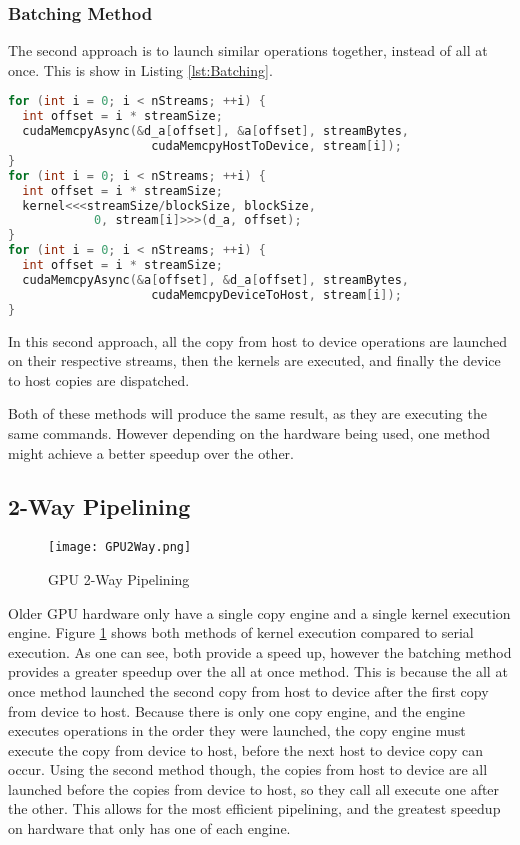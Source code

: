 \subsubsection{Batching Method}
The second approach is to launch similar operations together, instead of all at once. This is show in Listing \ref{lst:Batching}.
\begin{lstlisting}[language=C++,caption={Operations batched},label={lst:Batching}]
for (int i = 0; i < nStreams; ++i) {
  int offset = i * streamSize;
  cudaMemcpyAsync(&d_a[offset], &a[offset], streamBytes, 
                    cudaMemcpyHostToDevice, stream[i]);
}
for (int i = 0; i < nStreams; ++i) {
  int offset = i * streamSize;
  kernel<<<streamSize/blockSize, blockSize, 
            0, stream[i]>>>(d_a, offset);
}
for (int i = 0; i < nStreams; ++i) {
  int offset = i * streamSize;
  cudaMemcpyAsync(&a[offset], &d_a[offset], streamBytes, 
                    cudaMemcpyDeviceToHost, stream[i]);
}
\end{lstlisting}
In this second approach, all the copy from host to device operations are launched on their respective streams, then the kernels are executed, and finally the device to host copies are dispatched.

Both of these methods will produce the same result, as they are executing the same commands. However depending on the hardware being used, one method might achieve a better speedup over the other.

\subsection{2-Way Pipelining}
\begin{figure}[htp]
\centering
\texttt{[image: GPU2Way.png]}
\caption{GPU 2-Way Pipelining}
\label{fig:GPU2Way}
\end{figure}
Older GPU hardware only have a single copy engine and a single kernel execution engine. Figure \ref{fig:GPU2Way} shows both methods of kernel execution compared to serial execution. As one can see, both provide a speed up, however the batching method provides a greater speedup over the all at once method. This is because the all at once method launched the second copy from host to device after the first copy from device to host. Because there is only one copy engine, and the engine executes operations in the order they were launched, the copy engine must execute the copy from device to host, before the next host to device copy can occur. Using the second method though, the copies from host to device are all launched before the copies from device to host, so they call all execute one after the other. This allows for the most efficient pipelining, and the greatest speedup on hardware that only has one of each engine.
